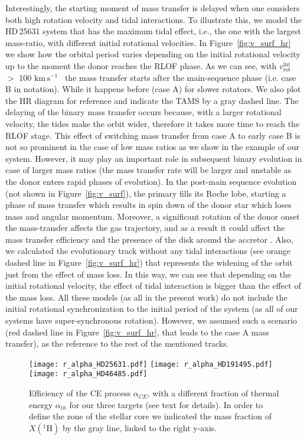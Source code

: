 \documentclass{aa}
\newcommand{\kms}{$\mathrm{km\,s^{-1}}$}
\DeclareRobustCommand{\Figref}[1]{Figure~\ref{#1}}
\begin{document}
Interestingly, the starting moment of mass transfer is delayed when one considers both high rotation velocity and tidal interactions.
To illustrate this, we model the HD\,25631
system that has the maximum tidal effect, i.e., the one with the largest
mass-ratio, with different initial rotational velocities. In
\Figref{fig:v_surf_hr} we show how the orbital period varies depending
on the initial rotational velocity up to the moment the donor reaches
the RLOF phase. As we can see, with $v_\mathrm{rot}^\mathrm{ini}$ $>$ 100
\kms~ the mass transfer starts after the main-sequence phase (i.e.
case B in \citealt{kippenhahn:67} notation). While it happens before (case A) for slower rotators. We
also plot the HR diagram for reference and indicate the TAMS by a gray
dashed line. The delaying of the binary mass transfer occurs because, with a
larger rotational velocity, the tides make the orbit wider, therefore it takes more time to reach the RLOF stage.
This effect of switching mass transfer from case A to early case B is not so prominent in the case of low mass ratios as we show in the example of our system.
However, it may play an important role in subsequent binary evolution
in case of larger mass ratios (the mass transfer rate will be larger and unstable as the donor enters rapid phases of evolution).
In the post-main sequence evolution (not shown in \Figref{fig:v_surf}), the primary fills its
Roche lobe, starting a phase of mass transfer which results in spin down of the donor star which loses mass and angular momentum.
Moreover, a significant rotation of the donor onset the mass-transfer affects the gas trajectory, and as a result it could affect the mass transfer efficiency and the presence of the disk around the accretor \citep[see,][]{Hendriks_2023}.
Also, we calculated the evolutionary track without any tidal interactions (see orange dashed line in \Figref{fig:v_surf_hr}) that represents the widening of the orbit just from the effect of mass loss.
In this way, we can see that depending on the initial rotational velocity, the effect of tidal interaction is bigger than the effect of the mass loss.
All these models (as all in the present work) do not include the initial rotational synchronization to the initial period of the system (as all of our systems have super-synchronous rotation).
However, we assumed such a scenario (red dashed line in \Figref{fig:v_surf_hr}, that leads to the case A mass transfer), as the reference to the rest of the mentioned tracks.



\begin{figure*}[!hbpt]
  \centering
  \texttt{[image: r\_alpha\_HD25631.pdf]}
  \texttt{[image: r\_alpha\_HD191495.pdf]}
  \texttt{[image: r\_alpha\_HD46485.pdf]}
  \caption{Efficiency of the CE process $\alpha_{CE}$, with a
    different fraction of thermal energy $\alpha_{th}$ for our three
    targets (see text for details). In order to define the zone of the
    stellar core we indicated the mass fraction of $X(^{1}\mathrm{H})$
    by the gray line, linked to the right y-axis.}
  \label{fig:hr_alpha}
\end{figure*}
\end{document}
